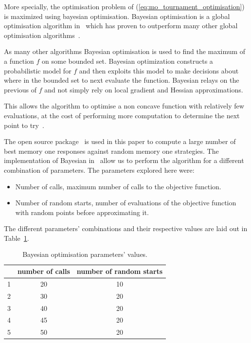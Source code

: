 \documentclass[10pt]{article}
\begin{document}
More specially, the optimisation problem of (\ref{eq:mo_tournament_optimisation})
is maximized using bayesian optimisation. Bayesian optimisation is a
global optimisation algorithm in~\cite{Mokus1978} which has proven to outperform many other
global optimisation algorithms~\cite{Jones2001}.

As many other algorithms Bayesian optimisation is used to find the maximum of a
function \(f\) on some bounded set. Bayesian optimization constructs a probabilistic
model for \(f\) and then exploits this model to make decisions about where in the
bounded set to next evaluate the function. Bayesian relays on the previous
of \(f\) and not simply rely on local gradient and Hessian approximations.

This allows the algorithm to optimise a non concave function with relatively few
evaluations, at the cost of performing more computation to determine the next point
to try~\cite{snoek2012}.

The open source package~\cite{Head2018} is used in this paper to compute a large
number of best memory one responses against random memory one strategies. The
implementation of Bayesian in~\cite{Head2018} allow us to perform the algorithm
for a different combination of parameters. The parameters explored here were:

\begin{itemize}
    \item Number of calls, maximum number of calls to the objective function.
    \item Number of random starts, number of evaluations of the objective function
    with random points before approximating it.
\end{itemize}

The different parameters' combinations and their respective values are laid out in
Table~\ref{table:ba_opt}.

\begin{table}[htbp]
\begin{center}
\begin{tabular}{ccc}
    \toprule
    {} &  number of calls & number of random starts\\
    \midrule
    1 & 20 & 10 \\
    2 & 30 & 20 \\
    3 & 40 & 20 \\
    4 & 45 & 20 \\
    5 & 50 & 20 \\
    \bottomrule
\end{tabular}
\end{center}
\caption{Bayesian optimisation parameters' values.}
\label{table:ba_opt}
\end{table}
\end{document}
